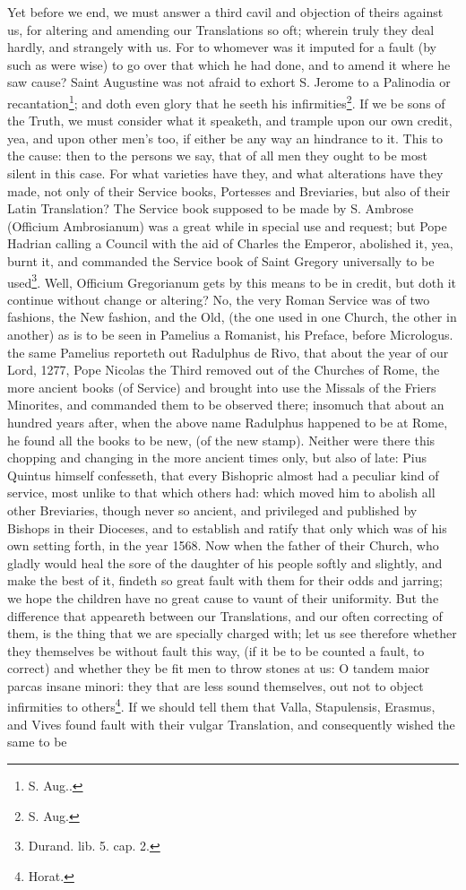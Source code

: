 Yet before we end, we must answer a third cavil and objection of theirs against us, for altering and amending our Translations so oft; wherein truly they deal hardly, and strangely with us. For to whomever was it imputed for a fault (by such as were wise) to go over that which he had done, and to amend it where he saw cause? Saint Augustine was not afraid to exhort S. Jerome to a Palinodia or recantation\footnote{S. Aug..}; and doth even glory that he seeth his infirmities\footnote{S. Aug.}. If we be sons of the Truth, we must consider what it speaketh, and trample upon our own credit, yea, and upon other men's too, if either be any way an hindrance to it. This to the cause: then to the persons we say, that of all men they ought to be most silent in this case. For what varieties have they, and what alterations have they made, not only of their Service books, Portesses and Breviaries, but also of their Latin Translation? The Service book supposed to be made by S. Ambrose (Officium Ambrosianum) was a great while in special use and request; but Pope Hadrian calling a Council with the aid of Charles the Emperor, abolished it, yea, burnt it, and commanded the Service book of Saint Gregory universally to be used\footnote{Durand. lib. 5. cap. 2.}. Well, Officium Gregorianum gets by this means to be in credit, but doth it continue without change or altering? No, the very Roman Service was of two fashions, the New fashion, and the Old, (the one used in one Church, the other in another) as is to be seen in Pamelius a Romanist, his Preface, before Micrologus. the same Pamelius reporteth out Radulphus de Rivo, that about the year of our Lord, 1277, Pope Nicolas the Third removed out of the Churches of Rome, the more ancient books (of Service) and brought into use the Missals of the Friers Minorites, and commanded them to be observed there; insomuch that about an hundred years after, when the above name Radulphus happened to be at Rome, he found all the books to be new, (of the new stamp). Neither were there this chopping and changing in the more ancient times only, but also of late: Pius Quintus himself confesseth, that every Bishopric almost had a peculiar kind of service, most unlike to that which others had: which moved him to abolish all other Breviaries, though never so ancient, and privileged and published by Bishops in their Dioceses, and to establish and ratify that only which was of his own setting forth, in the year 1568. Now when the father of their Church, who gladly would heal the sore of the daughter of his people softly and slightly, and make the best of it, findeth so great fault with them for their odds and jarring; we hope the children have no great cause to vaunt of their uniformity. But the difference that appeareth between our Translations, and our often correcting of them, is the thing that we are specially charged with; let us see therefore whether they themselves be without fault this way, (if it be to be counted a fault, to correct) and whether they be fit men to throw stones at us: O tandem maior parcas insane minori: they that are less sound themselves, out not to object infirmities to others\footnote{Horat.}. If we should tell them that Valla, Stapulensis, Erasmus, and Vives found fault with their vulgar Translation, and consequently wished the same to be 